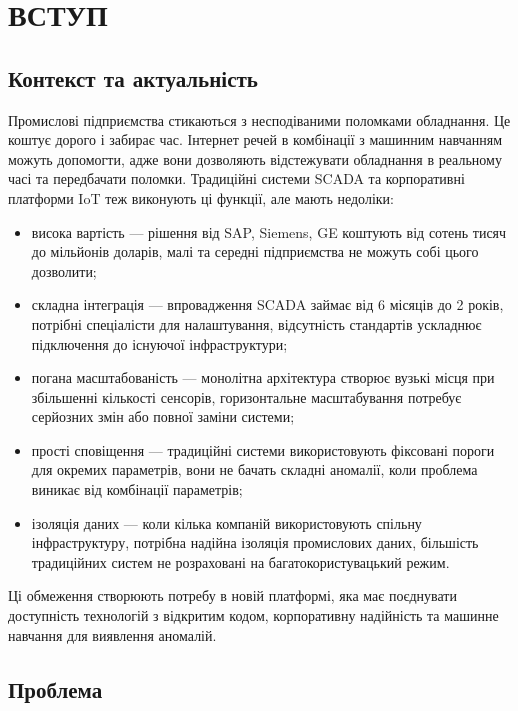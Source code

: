 \chapter{ВСТУП}

\section{Контекст та актуальність}

Промислові підприємства стикаються з несподіваними поломками обладнання. Це коштує дорого і забирає час. Інтернет речей в комбінації з машинним навчанням можуть допомогти, адже вони дозволяють відстежувати обладнання в реальному часі та передбачати поломки. Традиційні системи SCADA та корпоративні платформи IoT теж виконують ці функції, але мають недоліки:

\begin{itemize}
    \item висока вартість --- рішення від SAP, Siemens, GE коштують від сотень тисяч до мільйонів доларів, малі та середні підприємства не можуть собі цього дозволити;
    \item складна інтеграція --- впровадження SCADA займає від 6 місяців до 2 років, потрібні спеціалісти для налаштування, відсутність стандартів ускладнює підключення до існуючої інфраструктури;
    \item погана масштабованість --- монолітна архітектура створює вузькі місця при збільшенні кількості сенсорів, горизонтальне масштабування потребує серйозних змін або повної заміни системи;
    \item прості сповіщення --- традиційні системи використовують фіксовані пороги для окремих параметрів, вони не бачать складні аномалії, коли проблема виникає від комбінації параметрів;
    \item ізоляція даних --- коли кілька компаній використовують спільну інфраструктуру, потрібна надійна ізоляція промислових даних, більшість традиційних систем не розраховані на багатокористувацький режим.
\end{itemize}

Ці обмеження створюють потребу в новій платформі, яка має поєднувати доступність технологій з відкритим кодом, корпоративну надійність та машинне навчання для виявлення аномалій.


\section{Проблема}

